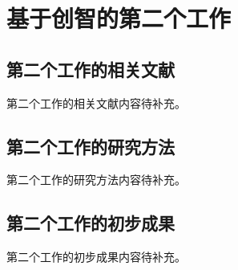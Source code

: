 \chapter{基于创智的第二个工作}
\label{chap:work2}

\section{第二个工作的相关文献}

第二个工作的相关文献内容待补充。

\section{第二个工作的研究方法}

第二个工作的研究方法内容待补充。

\section{第二个工作的初步成果}

第二个工作的初步成果内容待补充。
